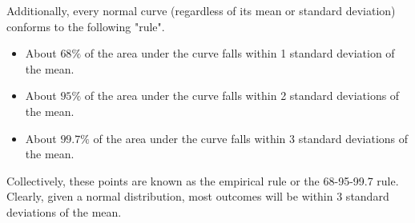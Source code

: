 
Additionally, every normal curve (regardless of its mean or standard deviation) conforms to the following "rule".

\begin{itemize}
\item About $68\%$ of the area under the curve falls within 1 standard deviation of the mean.
\item About $95\%$ of the area under the curve falls within 2 standard deviations of the mean.
\item About $99.7\%$ of the area under the curve falls within 3 standard deviations of the mean.
\end{itemize}

Collectively, these points are known as the empirical rule or the 68-95-99.7 rule. Clearly, given a normal distribution, most outcomes will be within 3 standard deviations of the mean.

